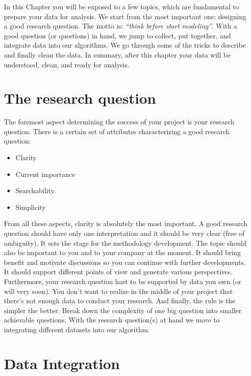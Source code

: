 In this Chapter you will be exposed to a few topics, which are fundamental to prepare your data for analysis. We start from the most important one: designing a good research question. The motto is: \textit{``think before start modeling''}. With a good question (or questions) in hand, we jump to collect, put together, and integrate data into our algorithms. We go through some of the tricks to describe and finally clean the data. In summary, after this chapter your data will be understood, clean, and ready for analysis.

\section{The research question}\label{RQ}

The foremost aspect determining the success of your project is your research question. There is a certain set of attributes characterizing a good research question:

\begin{itemize}
	\item Clarity
	\item Current importance
	\item Searchability
	\item Simplicity
\end{itemize}

From all these aspects, clarity is absolutely the most important. A good research question should have only one interpretation and it should be very clear (free of ambiguity). It sets the stage for the methodology development. The topic should also be important to you and to your company at the moment. It should bring benefit and motivate discussions so you can continue with further developments. It should support different points of view and generate various perspectives. Furthermore, your research question hast to be supported by data you own (or will very soon). You don't want to realize in the middle of your project that there's not enough data to conduct your research. And finally, the rule is the simpler the better. Break down the complexity of one big question into smaller achievable questions. With the research question(s) at hand we move to integrating different datasets into our algorithm.

\section{Data Integration}\label{dataI}

